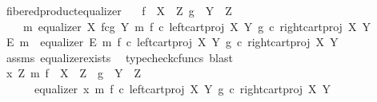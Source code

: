\begin{isabellebody}
\isanewline
{}\isamarkupfalse%
\ fibered{\isacharunderscore}{\kern0pt}product{\isacharunderscore}{\kern0pt}equalizer{\isacharcolon}{\kern0pt}\isanewline
\ \ \ {\isachardoublequoteopen}f\ {\isacharcolon}{\kern0pt}\ X\ {\isasymrightarrow}\ Z{\isachardoublequoteclose}\ {\isachardoublequoteopen}g\ {\isacharcolon}{\kern0pt}\ Y\ {\isasymrightarrow}\ Z{\isachardoublequoteclose}\isanewline
\ \ \ {\isachardoublequoteopen}{\isasymexists}\ m{\isachardot}{\kern0pt}\ equalizer\ {\isacharparenleft}{\kern0pt}X\ \isactrlbsub f\isactrlesub {\isasymtimes}\isactrlsub c\isactrlbsub g\isactrlesub \ Y{\isacharparenright}{\kern0pt}\ m\ {\isacharparenleft}{\kern0pt}f\ {\isasymcirc}\isactrlsub c\ left{\isacharunderscore}{\kern0pt}cart{\isacharunderscore}{\kern0pt}proj\ X\ Y{\isacharparenright}{\kern0pt}\ {\isacharparenleft}{\kern0pt}g\ {\isasymcirc}\isactrlsub c\ right{\isacharunderscore}{\kern0pt}cart{\isacharunderscore}{\kern0pt}proj\ X\ Y{\isacharparenright}{\kern0pt}{\isachardoublequoteclose}\isanewline
%
\isadelimproof
%
\endisadelimproof
%
\isatagproof
{}\isamarkupfalse%
\ {\isacharminus}{\kern0pt}\isanewline
\ \ \isamarkupfalse%
\ E\ m\ \ {\isachardoublequoteopen}equalizer\ E\ m\ {\isacharparenleft}{\kern0pt}f\ {\isasymcirc}\isactrlsub c\ left{\isacharunderscore}{\kern0pt}cart{\isacharunderscore}{\kern0pt}proj\ X\ Y{\isacharparenright}{\kern0pt}\ {\isacharparenleft}{\kern0pt}g\ {\isasymcirc}\isactrlsub c\ right{\isacharunderscore}{\kern0pt}cart{\isacharunderscore}{\kern0pt}proj\ X\ Y{\isacharparenright}{\kern0pt}{\isachardoublequoteclose}\isanewline
\ \ \ \ \isamarkupfalse%
\ assms\ equalizer{\isacharunderscore}{\kern0pt}exists\ \isamarkupfalse%
\ {\isacharparenleft}{\kern0pt}typecheck{\isacharunderscore}{\kern0pt}cfuncs{\isacharcomma}{\kern0pt}\ blast{\isacharparenright}{\kern0pt}\isanewline
\ \ \isamarkupfalse%
\ \isamarkupfalse%
\ {\isachardoublequoteopen}{\isasymexists}x\ Z\ m{\isachardot}{\kern0pt}\ f\ {\isacharcolon}{\kern0pt}\ X\ {\isasymrightarrow}\ Z\ {\isasymand}\ g\ {\isacharcolon}{\kern0pt}\ Y\ {\isasymrightarrow}\ Z\ {\isasymand}\isanewline
\ \ \ \ \ \ equalizer\ x\ m\ {\isacharparenleft}{\kern0pt}f\ {\isasymcirc}\isactrlsub c\ left{\isacharunderscore}{\kern0pt}cart{\isacharunderscore}{\kern0pt}proj\ X\ Y{\isacharparenright}{\kern0pt}\ {\isacharparenleft}{\kern0pt}g\ {\isasymcirc}\isactrlsub c\ right{\isacharunderscore}{\kern0pt}cart{\isacharunderscore}{\kern0pt}proj\ X\ Y{\isacharparenright}{\kern0pt}{\isachardoublequoteclose}\isanewline

\end{isabellebody}
